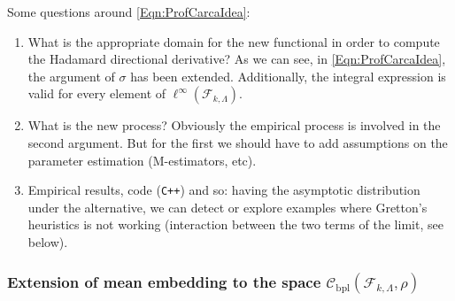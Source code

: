 	Some questions around \eqref{Eqn:ProfCarcaIdea}:
	\begin{enumerate}
		\item What is the appropriate domain for the new functional in order to compute the Hadamard directional derivative? As we can see, in \eqref{Eqn:ProfCarcaIdea}, the argument of $\sigma$ has been extended. Additionally, the integral expression is valid for every element of $\ell^{\infty}\left(\mathcal{F}_{k,\Lambda}\right)$.
		\item What is the new process? Obviously the empirical process is involved in the second argument. But for the first we should have to add assumptions on the parameter estimation (M-estimators, etc).
		\item Empirical results, code (\verb!C++!) and so: having the asymptotic distribution under the alternative, we can detect or explore examples where Gretton's heuristics is not working (interaction between the two terms of the limit, see below).
	\end{enumerate}
		\subsubsection*{Extension of mean embedding to the space $\mathcal{C}_{\operatorname{bpl}}\left(\mathcal{F}_{k,\Lambda},\rho\right)$}
